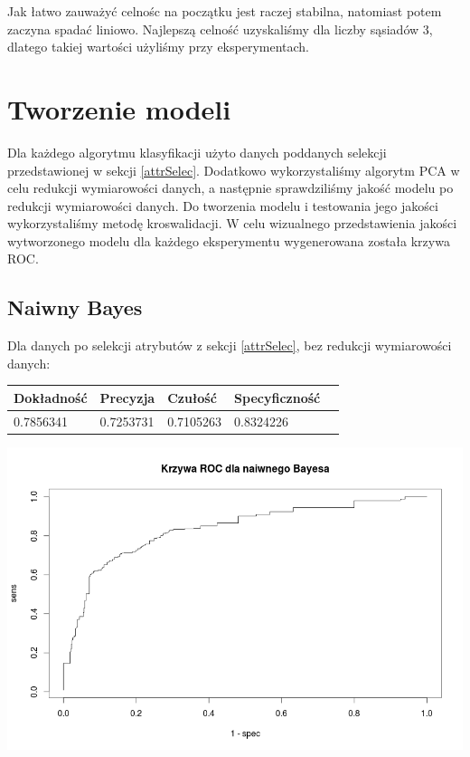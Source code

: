 \documentclass{article}
\begin{document}
Jak łatwo zauważyć celnośc na początku jest raczej stabilna, natomiast potem zaczyna spadać liniowo. Najlepszą celność uzyskaliśmy dla liczby sąsiadów $3$, dlatego takiej wartości użyliśmy przy eksperymentach.

\section{Tworzenie modeli}

Dla każdego algorytmu klasyfikacji użyto danych poddanych selekcji przedstawionej w sekcji \ref{attrSelec}. Dodatkowo wykorzystaliśmy algorytm PCA w celu redukcji wymiarowości danych, a następnie sprawdziliśmy jakość modelu po redukcji wymiarowości danych. Do tworzenia modelu i testowania jego jakości wykorzystaliśmy metodę kroswalidacji. W celu wizualnego przedstawienia jakości wytworzonego modelu dla każdego eksperymentu wygenerowana została krzywa ROC. 

\subsection{Naiwny Bayes}

Dla danych po selekcji atrybutów z sekcji \ref{attrSelec}, bez redukcji wymiarowości danych:

\begin{center}
    \begin{tabular}{| l | l | l | l | l|}
    \hline
        Dokładność &  Precyzja &  Czułość & Specyficzność \\ \hline
      	0.7856341 & 0.7253731 & 0.7105263 & 0.8324226  \\
    \hline
    \end{tabular}
\end{center}

\begin{center}
	\includegraphics[scale=0.40]{images/bayesNoPCA.png}
\end{center}
\end{document}
